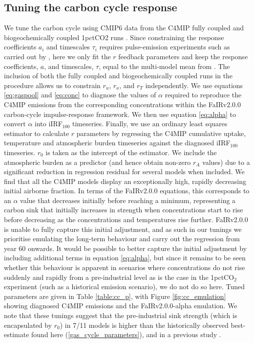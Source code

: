 \documentclass[gmd, manuscript]{copernicus}
\begin{document}
\subsection{Tuning the carbon cycle response} \label{cmip6_cc}
We tune the carbon cycle using CMIP6 data from the C4MIP \citep{Jones2016} fully coupled and biogeochemically coupled 1pctCO2 runs \citep{K.Arora2020}. Since constraining the response coefficients $a_i$ and timescales $\tau_i$ requires pulse-emission experiments such as carried out by \cite{Joos2013}, here we only fit the $r$ feedback parameters and keep the response coefficients, $a$, and timescales, $\tau$, equal to the multi-model mean from \citet{Joos2013}. The inclusion of both the fully coupled and biogeochemically coupled runs in the procedure allows us to constrain $r_u$, $r_a$, and $r_T$ independently. We use equations \ref{eq:gaspool} and \ref{eq:conc} to diagnose the values of $\alpha$ required to reproduce the C4MIP emissions from the corresponding concentrations within the FaIRv2.0.0 carbon-cycle impulse-response framework. We then use equation \ref{eq:alpha} to convert $\alpha$ into iIRF$_{100}$ timeseries. Finally, we use an ordinary least squares estimator to calculate $r$ parameters by regressing the C4MIP cumulative uptake, temperature and atmospheric burden timeseries against the diagnosed iIRF$_{100}$ timeseries. $r_0$ is taken as the intercept of the estimator. We include the atmospheric burden as a predictor (and hence obtain non-zero $r_A$ values) due to a significant reduction in regression residual for several models when included. We find that all the C4MIP models display an exceptionally high, rapidly decreasing initial airborne fraction. In terms of the FaIRv2.0.0 equations, this corresponds to an $\alpha$ value that decreases initially before reaching a minimum, representing a carbon sink that initially increases in strength when concentrations start to rise before decreasing as the concentrations and temperatures rise further. FaIRv2.0.0 is unable to fully capture this initial adjustment, and as such in our tunings we prioritise emulating the long-term behaviour and carry out the regression from year 60 onwards. It would be possible to better capture the initial adjustment by including additional terms in equation \ref{eq:alpha}, but since it remains to be seen whether this behaviour is apparent in scenarios where concentrations do not rise suddenly and rapidly from a pre-industrial level as is the case in the 1pctCO$_2$ experiment (such as a historical emission scenario), we do not do so here. Tuned parameters are given in Table \ref{table:cc_p}, with Figure \ref{fig:cc_emulation} showing diagnosed C4MIP emissions and the FaIRv2.0.0-alpha emulation. We note that these tunings suggest that the pre-industrial sink strength (which is encapsulated by $r_0$) in 7/11 models is higher than the historically observed best-estimate found here (\ref{gas_cycle_parameters}), and in a previous study \citep{Jenkins2018}. 
\end{document}
